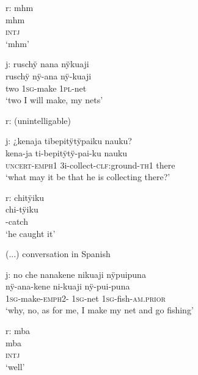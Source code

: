\ea%
\begingl 
\glpreamble \textup{r:} mhm\\
\gla mhm\\ 
\glb \textsc{intj}\\ 
\glft ‘mhm’\\ 
\endgl
\xe

\ea%
\begingl 
\glpreamble \textup{j:} ruschÿ nana nÿkuaji\\
\gla ruschÿ nÿ-ana nÿ-kuaji\\ 
\glb two 1\textsc{sg}-make 1\textsc{pl}-net\\ 
\glft ‘two I will make, my nets’\\ 
\endgl
\xe

\ea%
 \textup{r:} (unintelligable)
\xe


\ea%
\begingl 
\glpreamble \textup{j:} ¿kenaja tibepitÿtÿpaiku nauku?\\
\gla kena-ja ti-bepitÿtÿ-pai-ku nauku\\ 
\glb \textsc{uncert}-\textsc{emph}1 3i-collect-\textsc{clf:}ground-\textsc{th}1 there\\ 
\glft ‘what may it be that he is collecting there?’\\ 
\endgl
\xe

\ea%
\begingl 
\glpreamble \textup{r:} chitÿiku\\
\gla chi-tÿiku\\ 
-catch\\ 
\glft ‘he caught it’\\ 
\endgl
\xe

(...) conversation in Spanish


\ea%
\begingl 
\glpreamble \textup{j:} no che nanakene nikuaji nÿpuipuna\\
 nÿ-ana-kene ni-kuaji nÿ-pui-puna\\
 1\textsc{sg}-make-\textsc{emph}2- 1\textsc{sg}-net 1\textsc{sg}-fish-\textsc{am.prior}\\
\glft ‘why, no, as for me, I make my net and go fishing’
\endgl
\xe

\ea%
\begingl 
\glpreamble \textup{r:} mba\\
\gla mba\\ 
\glb \textsc{intj}\\ 
\glft ‘well’\\ 
\endgl
\xe


